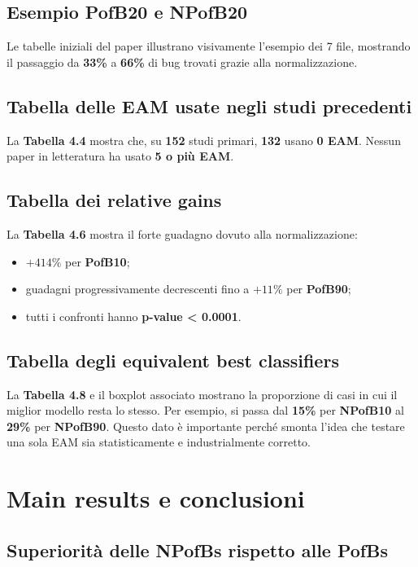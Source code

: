 \subsection{Esempio PofB20 e NPofB20}

Le tabelle iniziali del paper illustrano visivamente l'esempio dei 7 file, mostrando il passaggio da \textbf{33\%} a \textbf{66\%} di bug trovati grazie alla normalizzazione.

\subsection{Tabella delle EAM usate negli studi precedenti}

La \textbf{Tabella 4.4} mostra che, su \textbf{152} studi primari, \textbf{132} usano \textbf{0 EAM}. Nessun paper in letteratura ha usato \textbf{5 o più EAM}.

\subsection{Tabella dei relative gains}

La \textbf{Tabella 4.6} mostra il forte guadagno dovuto alla normalizzazione:
\begin{itemize}
    \item \(+414\%\) per \textbf{PofB10};
    \item guadagni progressivamente decrescenti fino a \(+11\%\) per \textbf{PofB90};
    \item tutti i confronti hanno \textbf{p-value < 0.0001}.
\end{itemize}

\subsection{Tabella degli equivalent best classifiers}

La \textbf{Tabella 4.8} e il boxplot associato mostrano la proporzione di casi in cui il miglior modello resta lo stesso. Per esempio, si passa dal \textbf{15\%} per \textbf{NPofB10} al \textbf{29\%} per \textbf{NPofB90}. Questo dato è importante perché smonta l'idea che testare una sola EAM sia statisticamente e industrialmente corretto.

\section{Main results e conclusioni}

\subsection{Superiorità delle NPofBs rispetto alle PofBs}

